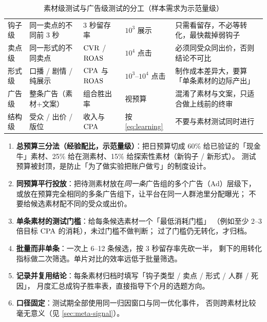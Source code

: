 \begin{table}[htbp]
\centering
\caption{素材级测试与广告级测试的分工（样本需求为示范量级）}
\label{tab:testlevel}
\small
\begin{tabularx}{\textwidth}{L{2.2cm} L{2.6cm} L{2.7cm} L{2.6cm} Y}
\toprule
{} &  &  &  &  \\
\midrule
钩子级 & 同一卖点的不同前 3 秒 & 3 秒留存率 & $10^3$ 展示 & 只需看留存，不必等转化，最快裁掉弱钩子 \\
卖点级 & 同一形式的不同卖点 & $\operatorname{CVR}$ / $\operatorname{ROAS}$ & $10^4$ 点击 & 必须同受众同出价，否则结论不可比 \\
形式级 & 口播 / 剧情 / 纯展示 & $\operatorname{CPA}$ 与 $\operatorname{ROAS}$ & $10^3$--$10^4$ 点击 & 制作成本差异大，要算「单条素材的边际产出」 \\
广告级 & 整条广告（素材+文案） & 组合胜出率 & 视预算 & 混淆了素材与文案，只适合做上线前的终审 \\
结构级 & 受众 / 出价 / 版位 & 收入与 $\operatorname{CPA}$ & 按 \cref{eq:learning} & 不要与素材测试同时进行 \\
\bottomrule
\end{tabularx}
\end{table}

\begin{toolbox}[素材测试预算的分配与节奏]
\begin{enumerate}
  \item \textbf{总预算三分法（经验配比，示范量级）}：把日预算切成
        60\% 给已验证的「现金牛」素材、25\% 给在测素材、15\% 给探索性素材（新钩子 / 新形式）。
        测试预算被封顶，是防止「为了做实验把账户做亏」的制度设计。
  \item \textbf{同预算平行投放}：把待测素材放在\emph{同一条}广告组的多个广告（Ad）层级下，
        或放在预算完全相同的多条广告组下，让平台在同一人群池里分配曝光；
        不要给候选素材配不同的受众或出价。
  \item \textbf{单条素材的测试门槛}：给每条候选素材一个「最低消耗门槛」
        （例如至少 2--3 倍目标 $\operatorname{CPA}$ 的消耗），未过门槛不做判断；
        过了门槛仍无转化，才归档。
  \item \textbf{批量而非单条}：一次上 6--12 条候选，按 3 秒留存率先砍一半，
        剩下的用转化指标做二次筛选。单片对比的效率远低于批量筛选。
  \item \textbf{记录并复用结论}：每条素材归档时填写「钩子类型 / 卖点 / 形式 / 人群 / 死因」，
        月度汇总成钩子胜率表，直接指导下个月的选题方向。
  \item \textbf{口径固定}：测试期全部使用同一归因窗口与同一优化事件，
        否则跨素材比较毫无意义（见 \cref{sec:meta-signal}）。
\end{enumerate}
\end{toolbox}

